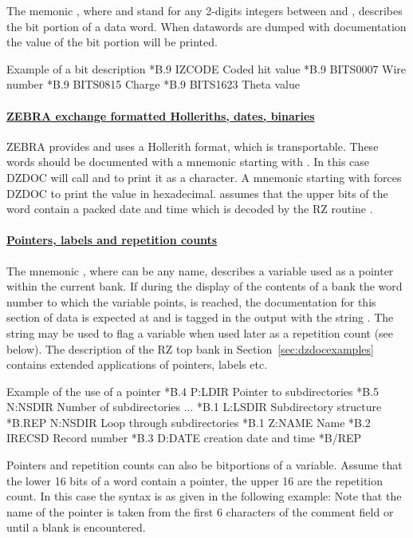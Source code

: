 The memonic , where  and  
stand for any 2-digits integers between  and , 
describes the bit portion of a data word.
When datawords are dumped with documentation the value
of the bit portion will be printed.
 
\begin{XMPt}{Example of a bit description}
*B.9      IZCODE     Coded hit value
*B.9      BITS0007   Wire number
*B.9      BITS0815   Charge
*B.9      BITS1623   Theta value
\end{XMPt}
 
\paragraph{\underline{\bf ZEBRA exchange formatted Holleriths,
dates, binaries}}
ZEBRA provides and uses a Hollerith format, which is transportable.
These words should be documented with a mnemonic starting with
. In this case DZDOC will call  and  to print
it as a character. A mnemonic starting with  forces DZDOC
to print the value in hexadecimal.  assumes that the upper
bits of the word contain a packed date and time which is decoded
by the RZ routine .
 
\paragraph{\underline{\bf Pointers, labels and repetition counts}}
\label{pointer (bank documentation)}
\label{repetition (bank documentation)}
 
The mnemonic , where  can be any name,
describes a variable used as a pointer within the current bank. 
If during the display of 
the contents of a bank the word number to which the variable points, 
is reached, the documentation for this section of data is expected
at  and is tagged in the output with the string .
The string  may be used to flag a variable when 
used later as a repetition count (see below). 
The description of the RZ top bank in Section~\ref{sec:dzdocexamples}
contains extended applications of pointers, labels etc.
\begin{XMPt}{Example of the use of a pointer}
*B.4      P:LDIR     Pointer to subdirectories
*B.5      N:NSDIR    Number of subdirectories
     ...
*B.1      L:LSDIR    Subdirectory structure
*B.REP    N:NSDIR    Loop through subdirectories
*B.1      Z:NAME     Name
*B.2      IRECSD     Record number
*B.3      D:DATE     creation date and time
*B/REP
\end{XMPt}
Pointers and repetition counts can also be bitportions of a variable.
Assume that the lower 16 bits of a word contain a pointer, the upper
16 are the repetition count.
In this case the syntax is as given in the following example:
Note that the name of the pointer  is taken from the first 6 characters
of the comment field or until a blank is encountered.
\pagebreak[3]
 
